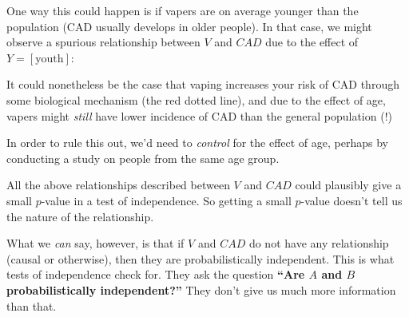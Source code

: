 \documentclass[10pt]{article}
\theoremstyle{definition}
\newcommand{\1}[1]{\textbf{1}_{\left[#1\right]}} %
\begin{document}
\begin{itemize}
  One way this could happen is if vapers are on average younger than the
  population (CAD usually develops in older people). In that case, we might
  observe a spurious relationship between $V$ and $CAD$ due to the effect of
  $Y= \left[ \text{youth} \right]$:
  \begin{center}
  \end{center}
  It could nonetheless be the case that vaping increases your risk of CAD
  through some biological mechanism (the red dotted line), and due to the
  effect of age, vapers might \textit{still} have lower incidence of CAD than
  the general population (!)

  In order to rule this out, we'd need to \textit{control} for the effect of
  age, perhaps by conducting a study on people from the same age group.
\end{itemize}

All the above relationships described between $V$ and $CAD$ could plausibly
give a small $p$-value in a test of independence. So getting a small $p$-value
doesn't tell us the nature of the relationship.


What we \textit{can} say, however, is that if $V$ and $CAD$ do not have any
relationship (causal or otherwise), then they are probabilistically
independent. This is what tests of independence check for. They ask the
question \textbf{``Are $A$ and $B$ probabilistically independent?''} They
don't give us much more information than that.
\end{document}
